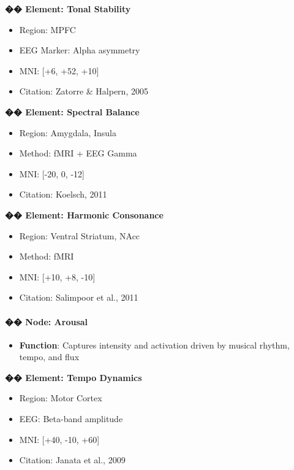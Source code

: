 \textbf{�� Element: Tonal Stability}

\begin{itemize}
    \item Region: MPFC
    \item EEG Marker: Alpha asymmetry
    \item MNI: [+6, +52, +10]
    \item Citation: Zatorre \& Halpern, 2005
\end{itemize}

\textbf{�� Element: Spectral Balance}

\begin{itemize}
    \item Region: Amygdala, Insula
    \item Method: fMRI + EEG Gamma
    \item MNI: [-20, 0, -12]
    \item Citation: Koelsch, 2011
\end{itemize}

\textbf{�� Element: Harmonic Consonance}

\begin{itemize}
    \item Region: Ventral Striatum, NAcc
    \item Method: fMRI
    \item MNI: [+10, +8, -10]
    \item Citation: Salimpoor et al., 2011
\end{itemize}

\paragraph{�� Node: Arousal}

\begin{itemize}
    \item \textbf{Function}: Captures intensity and activation driven by musical rhythm, tempo, and flux
\end{itemize}

\textbf{�� Element: Tempo Dynamics}

\begin{itemize}
    \item Region: Motor Cortex
    \item EEG: Beta-band amplitude
    \item MNI: [+40, -10, +60]
    \item Citation: Janata et al., 2009
\end{itemize}

